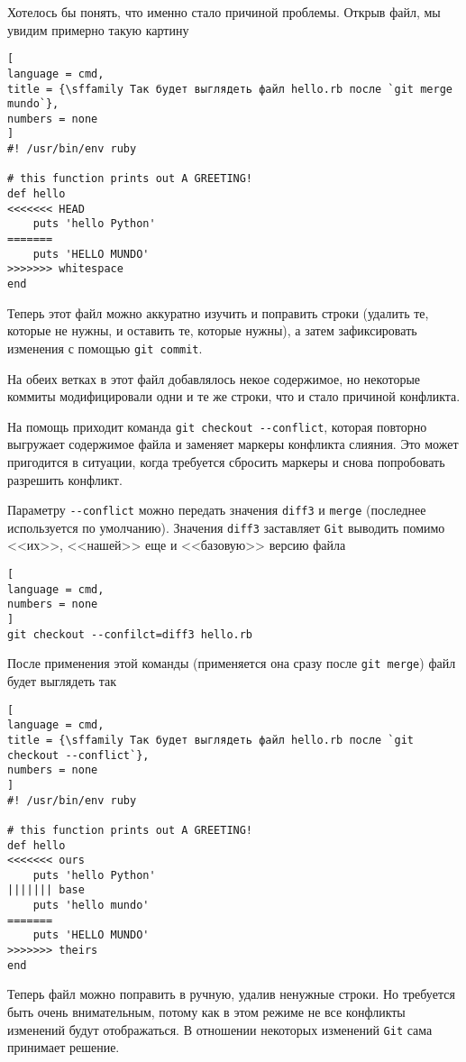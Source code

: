 \documentclass[%
	11pt,
	a4paper,
	utf8,
		]{article}
\begin{document}
Хотелось бы понять, что именно стало причиной проблемы. Открыв файл, мы увидим примерно такую картину
\begin{lstlisting}[
language = cmd,
title = {\sffamily Так будет выглядеть файл hello.rb после `git merge mundo`},
numbers = none
]
#! /usr/bin/env ruby

# this function prints out A GREETING!
def hello
<<<<<<< HEAD
    puts 'hello Python'
=======
    puts 'HELLO MUNDO'
>>>>>>> whitespace
end

\end{lstlisting}

Теперь этот файл можно аккуратно изучить и поправить строки (удалить те, которые не нужны, и оставить те, которые нужны), а затем зафиксировать изменения с помощью \texttt{git commit}.

На обеих ветках в этот файл добавлялось некое содержимое, но некоторые коммиты модифицировали одни и те же строки, что и стало причиной конфликта.

На помощь приходит команда \verb|git checkout --conflict|, которая повторно выгружает содержимое файла и заменяет маркеры конфликта слияния. Это может пригодится в ситуации, когда требуется сбросить маркеры и снова попробовать разрешить конфликт. 

Параметру \verb|--conflict| можно передать значения \texttt{diff3} и \texttt{merge} (последнее используется по умолчанию). Значения \texttt{diff3} заставляет \texttt{Git} выводить помимо <<их>>, <<нашей>> еще и <<базовую>> версию файла
\begin{lstlisting}[
language = cmd,
numbers = none
]
git checkout --confilct=diff3 hello.rb
\end{lstlisting}

После применения этой команды (применяется она сразу после \texttt{git merge}) файл будет выглядеть так
\begin{lstlisting}[
language = cmd,
title = {\sffamily Так будет выглядеть файл hello.rb после `git checkout --conflict`},
numbers = none
]
#! /usr/bin/env ruby

# this function prints out A GREETING!
def hello
<<<<<<< ours
    puts 'hello Python'
||||||| base
    puts 'hello mundo'
=======
    puts 'HELLO MUNDO'
>>>>>>> theirs
end
\end{lstlisting}

Теперь файл можно поправить в ручную, удалив ненужные строки. Но требуется быть очень внимательным, потому как в этом режиме не все конфликты изменений будут отображаться. В отношении некоторых изменений \texttt{Git} сама принимает решение.
\end{document}
